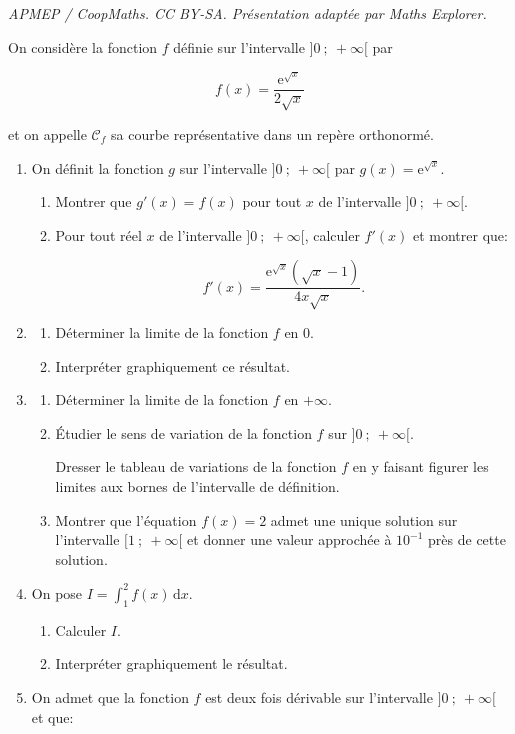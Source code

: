\documentclass[10pt]{article}
\providecommand{\e}{{\mathrm{e}}}
\begin{document}
\noindent\textit{APMEP / CoopMaths. CC BY-SA. Présentation adaptée par Maths Explorer.}\par\medskip
On considère la fonction $f$ définie sur l'intervalle $]0~;~ + \infty[$ par

\[f(x) = \frac{\e^{\sqrt{x}}}{2\sqrt{x}}\]

et on appelle $\mathcal{C}_f$ sa courbe représentative dans un repère orthonormé.

\medskip

\begin{enumerate}
\item On définit la fonction $g$ sur l'intervalle $]0~;~ + \infty[$ par $g(x) = \e^{\sqrt{x}}$.
	\begin{enumerate}
		\item Montrer que $g'(x) = f(x)$ pour tout $x$ de l'intervalle $]0~;~ + \infty[$.
		\item Pour tout réel $x$ de l'intervalle $]0~;~ + \infty[$, calculer $f'(x)$ et montrer que:

\[f'(x) = \dfrac{\e^{\sqrt{x}}\left(\sqrt x - 1\right)}{4x\sqrt x}.\]
	\end{enumerate}
\item
	\begin{enumerate}
		\item Déterminer la limite de la fonction $f$ en $0$.
		\item Interpréter graphiquement ce résultat.
	\end{enumerate}
\item
	\begin{enumerate}
		\item Déterminer la limite de la fonction $f$ en $+ \infty$.
		\item Étudier le sens de variation de la fonction $f$ sur $]0~;~+ \infty[$.

Dresser le tableau de variations de la fonction $f$ en y faisant figurer les limites aux bornes de l'intervalle de définition.
		\item Montrer que l'équation $f(x) = 2$ admet une unique solution sur l'intervalle $[1~;~+\infty[$ et donner une valeur approchée à $10^{-1}$ près de cette solution.
	\end{enumerate}
\item On pose  $I = \displaystyle\int_1^2 f(x)\, \text{d}x$.
	\begin{enumerate}
		\item Calculer $I$.
		\item Interpréter graphiquement le résultat.
	\end{enumerate}
\item On admet que la fonction $f$ est deux fois dérivable sur l'intervalle $]0~;~ + \infty[$ et que:


\end{enumerate}
\end{document}
